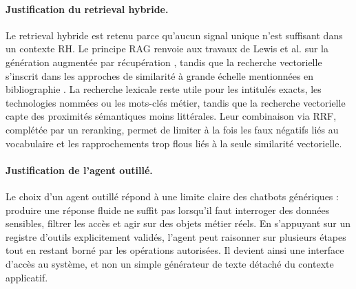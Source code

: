 \paragraph{Justification du retrieval hybride.}
Le retrieval hybride est retenu parce qu'aucun signal unique n'est suffisant dans un contexte RH. Le principe RAG renvoie aux travaux de Lewis et al. sur la génération augmentée par récupération , tandis que la recherche vectorielle s'inscrit dans les approches de similarité à grande échelle mentionnées en bibliographie . La recherche lexicale reste utile pour les intitulés exacts, les technologies nommées ou les mots-clés métier, tandis que la recherche vectorielle capte des proximités sémantiques moins littérales. Leur combinaison via RRF, complétée par un reranking, permet de limiter à la fois les faux négatifs liés au vocabulaire et les rapprochements trop flous liés à la seule similarité vectorielle.

\paragraph{Justification de l'agent outillé.}
Le choix d'un agent outillé répond à une limite claire des chatbots génériques : produire une réponse fluide ne suffit pas lorsqu'il faut interroger des données sensibles, filtrer les accès et agir sur des objets métier réels. En s'appuyant sur un registre d'outils explicitement validés, l'agent peut raisonner sur plusieurs étapes tout en restant borné par les opérations autorisées. Il devient ainsi une interface d'accès au système, et non un simple générateur de texte détaché du contexte applicatif.

